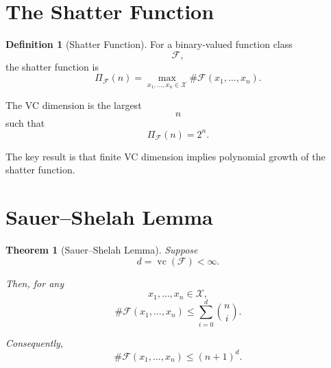 \documentclass[12pt,oneside]{book}
\numberwithin{equation}{section}
\theoremstyle{definition}
\newtheorem{definition}{Definition}[section]
\theoremstyle{plain}
\newtheorem{theorem}{Theorem}[section]
\theoremstyle{remark}
\begin{document}
\section{The Shatter Function}

\begin{definition}[Shatter Function]
For a binary-valued function class
\[
\mathcal{F},
\]
the shatter function is
\[
\Pi_{\mathcal{F}}(n)
=
\max_{x_1,\dots,x_n\in\mathcal{X}}
\#\mathcal{F}(x_1,\dots,x_n).
\]
\end{definition}

The VC dimension is the largest
\[
n
\]
such that
\[
\Pi_{\mathcal{F}}(n)=2^n.
\]

The key result is that finite VC dimension implies polynomial growth of the shatter function.

\section{Sauer--Shelah Lemma}

\begin{theorem}[Sauer--Shelah Lemma]
Suppose
\[
d=\operatorname{vc}(\mathcal{F})<\infty.
\]

Then, for any
\[
x_1,\dots,x_n\in\mathcal{X},
\]
\[
\#\mathcal{F}(x_1,\dots,x_n)
\leq
\sum_{i=0}^d \binom{n}{i}.
\]

Consequently,
\[
\#\mathcal{F}(x_1,\dots,x_n)
\leq
(n+1)^d.
\]
\end{theorem}
\end{document}
